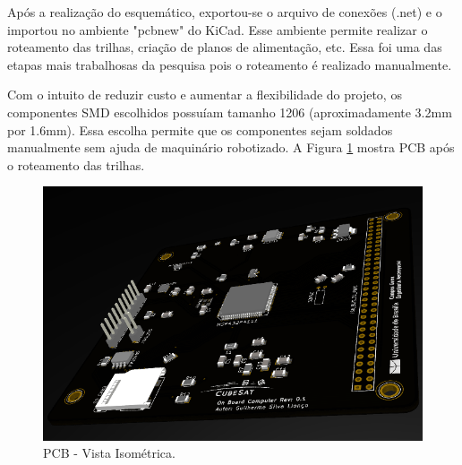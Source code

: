 \newpage

Após a realização do esquemático, exportou-se o arquivo de conexões (.net) e o importou no ambiente "pcbnew" do KiCad. Esse ambiente permite realizar o roteamento das trilhas, criação de planos de alimentação, etc. Essa foi uma das etapas mais trabalhosas da pesquisa pois o roteamento é realizado manualmente. 

Com o intuito de reduzir custo e aumentar a flexibilidade do projeto, os componentes SMD escolhidos possuíam tamanho 1206 (aproximadamente 3.2mm por 1.6mm). Essa escolha permite que os componentes sejam soldados manualmente sem ajuda de maquinário robotizado. A Figura \ref{pcb_isoView} mostra PCB após o roteamento das trilhas.

\begin{figure}[h]
	\centering
	\caption{PCB - Vista Isométrica.}
	
	\includegraphics[keepaspectratio=true,scale=0.78]{figuras/pcbRealistic.PNG}
	
	\label{pcb_isoView}
\end{figure}

